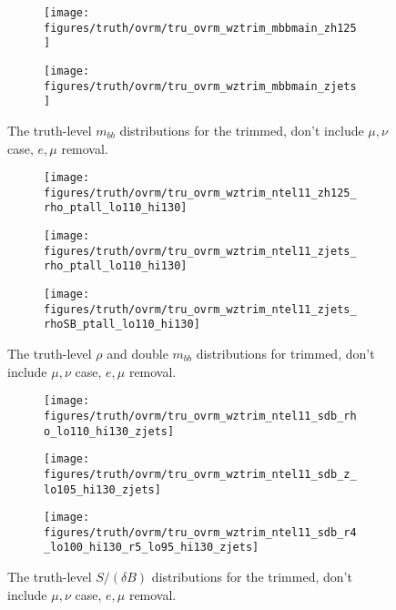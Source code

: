 \begin{figure}[!htbp]\captionsetup{justification=centering}
\begin{center}
\begin{subfigure}[t]{18pc}\centering\texttt{[image: figures/truth/ovrm/tru\_ovrm\_wztrim\_mbbmain\_zh125]}\caption{}\end{subfigure}
\begin{subfigure}[t]{18pc}\centering\texttt{[image: figures/truth/ovrm/tru\_ovrm\_wztrim\_mbbmain\_zjets]}\caption{}\end{subfigure}
\caption{\label{fig:mbbwztrimovrm}The truth-level $m_{bb}$ distributions for the trimmed, don't include $\mu,\nu$ case, $e,\mu$ removal.}
\end{center}
\end{figure}
\begin{figure}[!htbp]\captionsetup{justification=centering}
\begin{center}
\begin{subfigure}[t]{18pc}\centering\texttt{[image: figures/truth/ovrm/tru\_ovrm\_wztrim\_ntel11\_zh125\_rho\_ptall\_lo110\_hi130]}\caption{}\end{subfigure}
\begin{subfigure}[t]{18pc}\centering\texttt{[image: figures/truth/ovrm/tru\_ovrm\_wztrim\_ntel11\_zjets\_rho\_ptall\_lo110\_hi130]}\caption{}\end{subfigure}
\begin{subfigure}[t]{18pc}\centering\texttt{[image: figures/truth/ovrm/tru\_ovrm\_wztrim\_ntel11\_zjets\_rhoSB\_ptall\_lo110\_hi130]}\caption{}\end{subfigure}
\caption{\label{fig:mbbwztrim}The truth-level $\rho$ and double $m_{bb}$ distributions for trimmed, don't include $\mu,\nu$ case, $e,\mu$ removal.}
\end{center}
\end{figure}
\begin{figure}[!htbp]\captionsetup{justification=centering}
\begin{center}
\begin{subfigure}[t]{18pc}\centering\texttt{[image: figures/truth/ovrm/tru\_ovrm\_wztrim\_ntel11\_sdb\_rho\_lo110\_hi130\_zjets]}\caption{}\end{subfigure}
\begin{subfigure}[t]{18pc}\centering\texttt{[image: figures/truth/ovrm/tru\_ovrm\_wztrim\_ntel11\_sdb\_z\_lo105\_hi130\_zjets]}\caption{}\end{subfigure}
\begin{subfigure}[t]{18pc}\centering\texttt{[image: figures/truth/ovrm/tru\_ovrm\_wztrim\_ntel11\_sdb\_r4\_lo100\_hi130\_r5\_lo95\_hi130\_zjets]}\caption{}\end{subfigure}
\caption{\label{fig:mbbwztrim}The truth-level $S/(\delta B)$ distributions for the trimmed, don't include $\mu,\nu$ case, $e,\mu$ removal.}
\end{center}
\end{figure}
\clearpage

